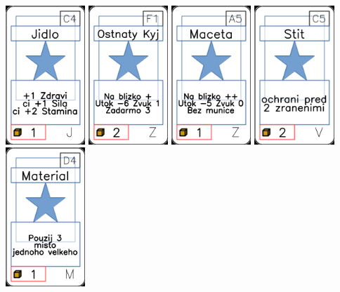 \documentclass[a4paper]{article}
\begin{document}
	\includegraphics[width=3.0cm]{img-1_13}
	\includegraphics[width=3.0cm]{img-1_85}
	\includegraphics[width=3.0cm]{img-1_94}
	\includegraphics[width=3.0cm]{img-1_74}
	\includegraphics[width=3.0cm]{img-1_48}
\end{document}
